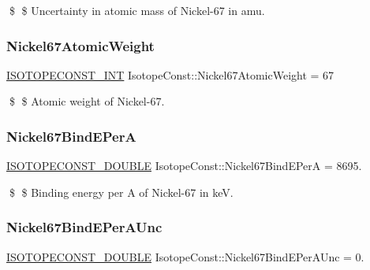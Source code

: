 \$ \$ Uncertainty in atomic mass of Nickel-\/67 in amu. \mbox{\label{group___isotope_const-_nickel-_ni67_ga182aacd9720bd5ce68664a28af489122}} 
\subsubsection{\texorpdfstring{Nickel67\+Atomic\+Weight}{Nickel67AtomicWeight}}
{\footnotesize\ttfamily \mbox{\hyperlink{group___isotope_const-_macros_ga5f18360b3e99483a35c32d789e62621c}{I\+S\+O\+T\+O\+P\+E\+C\+O\+N\+S\+T\+\_\+\+I\+NT}} Isotope\+Const\+::\+Nickel67\+Atomic\+Weight = 67}

\$ \$ Atomic weight of Nickel-\/67. \mbox{\label{group___isotope_const-_nickel-_ni67_ga6c47149ff0e6de0933c3bd998be855c5}} 
\subsubsection{\texorpdfstring{Nickel67\+Bind\+E\+PerA}{Nickel67BindEPerA}}
{\footnotesize\ttfamily \mbox{\hyperlink{group___isotope_const-_macros_ga8f45a7272ce02c0b4c65c44636ed719a}{I\+S\+O\+T\+O\+P\+E\+C\+O\+N\+S\+T\+\_\+\+D\+O\+U\+B\+LE}} Isotope\+Const\+::\+Nickel67\+Bind\+E\+PerA = 8695.}

\$ \$ Binding energy per A of Nickel-\/67 in keV. \mbox{\label{group___isotope_const-_nickel-_ni67_ga6df03ab16ea63a7ec52245cc269887ad}} 
\subsubsection{\texorpdfstring{Nickel67\+Bind\+E\+Per\+A\+Unc}{Nickel67BindEPerAUnc}}
{\footnotesize\ttfamily \mbox{\hyperlink{group___isotope_const-_macros_ga8f45a7272ce02c0b4c65c44636ed719a}{I\+S\+O\+T\+O\+P\+E\+C\+O\+N\+S\+T\+\_\+\+D\+O\+U\+B\+LE}} Isotope\+Const\+::\+Nickel67\+Bind\+E\+Per\+A\+Unc = 0.}

